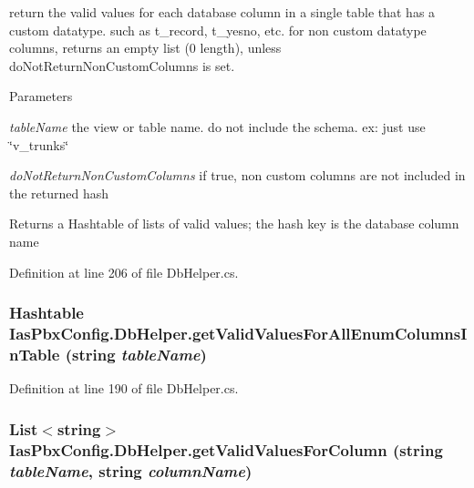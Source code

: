 return the valid values for each database column in a single table that has a custom datatype. such as t\_\-record, t\_\-yesno, etc. for non custom datatype columns, returns an empty list (0 length), unless doNotReturnNonCustomColumns is set. 
\begin{DoxyParams}{Parameters}
\item[{\em tableName}]the view or table name. do not include the schema. ex: just use \char`\"{}v\_\-trunks\char`\"{} \item[{\em doNotReturnNonCustomColumns}]if true, non custom columns are not included in the returned hash \end{DoxyParams}
\begin{DoxyReturn}{Returns}
a Hashtable of lists of valid values; the hash key is the database column name 
\end{DoxyReturn}


Definition at line 206 of file DbHelper.cs.\hypertarget{class_ias_pbx_config_1_1_db_helper_ac35315fd4d2d96439ae8efcc4150aa80}{
\subsubsection[{getValidValuesForAllEnumColumnsInTable}]{\setlength{\rightskip}{0pt plus 5cm}Hashtable IasPbxConfig.DbHelper.getValidValuesForAllEnumColumnsInTable (string {\em tableName})}}
\label{class_ias_pbx_config_1_1_db_helper_ac35315fd4d2d96439ae8efcc4150aa80}


Definition at line 190 of file DbHelper.cs.\hypertarget{class_ias_pbx_config_1_1_db_helper_a1f1f49a5678367e1ebe7552e51627642}{
\subsubsection[{getValidValuesForColumn}]{\setlength{\rightskip}{0pt plus 5cm}List$<$string$>$ IasPbxConfig.DbHelper.getValidValuesForColumn (string {\em tableName}, \/  string {\em columnName})}}
\label{class_ias_pbx_config_1_1_db_helper_a1f1f49a5678367e1ebe7552e51627642}


